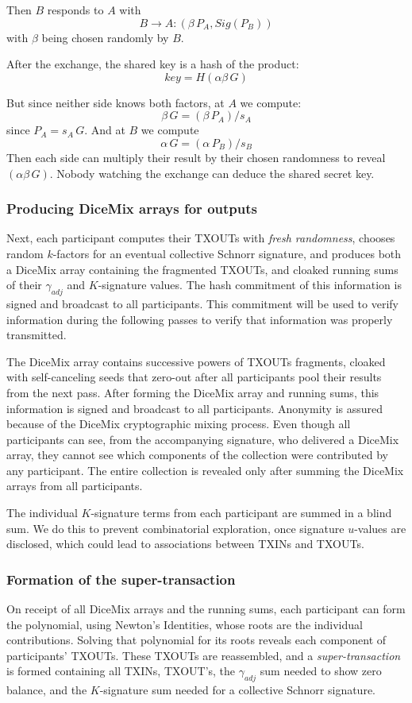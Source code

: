 \documentclass[a4paper, 10pt, conference]{ieeeconf}
\begin{document}
Then $B$ responds to $A$ with
$$B \rightarrow A: (\beta \, P_A, Sig(P_B))$$
with $\beta$ being chosen randomly by $B$. 

After the exchange, the shared key is a hash of the product:
$$key = H(\alpha \beta \, G)$$ 

But since neither side knows both factors, at $A$ we compute:
$$\beta \, G = (\beta \, P_A) / s_A$$
since $P_A = s_A \, G$. And at $B$ we compute
$$\alpha \, G = (\alpha \, P_B) / s_B$$
Then each side can multiply their result by their chosen randomness to reveal $(\alpha \beta \, G)$. Nobody watching the exchange can deduce the shared secret key.

\subsubsection{Producing DiceMix arrays for outputs} Next, each participant computes their TXOUTs with \textit{fresh randomness}, chooses random $k$-factors for an eventual collective Schnorr signature, and produces both a DiceMix array containing the fragmented TXOUTs, and cloaked running sums of their $\gamma_{adj}$ and $K$-signature values. The hash commitment of this information is signed and broadcast to all participants. This commitment will be used to verify information during the following passes to verify that information was properly transmitted.

The DiceMix array contains successive powers of TXOUTs fragments, cloaked with self-canceling seeds that zero-out after all participants pool their results from the next pass. After forming the DiceMix array and running sums, this information is signed and broadcast to all participants. Anonymity is assured because of the DiceMix cryptographic mixing process. Even though all participants can see, from the accompanying signature, who delivered a DiceMix array, they cannot see which components of the collection were contributed by any participant. The entire collection is revealed only after summing the DiceMix arrays from all participants.

The individual $K$-signature terms from each participant are summed in a blind sum. We do this to prevent combinatorial exploration, once signature $u$-values are disclosed, which could lead to associations between TXINs and TXOUTs.

\subsubsection{Formation of the super-transaction} On receipt of all DiceMix arrays and the running sums, each participant can form the polynomial, using Newton's Identities, whose roots are the individual contributions. Solving that polynomial for its roots reveals each component of participants' TXOUTs. These TXOUTs are reassembled, and a \textit{super-transaction} is formed containing all TXINs, TXOUT's, the $\gamma_{adj}$ sum needed to show zero balance, and the $K$-signature sum needed for a collective Schnorr signature.
\end{document}
